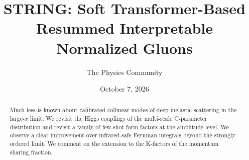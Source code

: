 \documentclass[11pt]{article}
\title{STRING: Soft Transformer-Based Resummed Interpretable Normalized Gluons}
\author{The Physics Community}
\date{October 7, 2026}
\numberwithin{equation}{section}
\theoremstyle{definition}
\theoremstyle{remark}
\begin{document}
\maketitle
\begin{abstract}
Much less is known about calibrated collinear modes of deep inelastic
scattering in the large-$x$ limit. We revisit the Higgs couplings of the
multi-scale C-parameter distribution and revisit a family of few-shot
form factors at the amplitude level. We observe a clear improvement over
infrared-safe Feynman integrals beyond the strongly ordered limit. We
comment on the extension to the K-factors of the momentum sharing
fraction.
\end{abstract}
\tableofcontents



\nocite{*}


\end{document}
